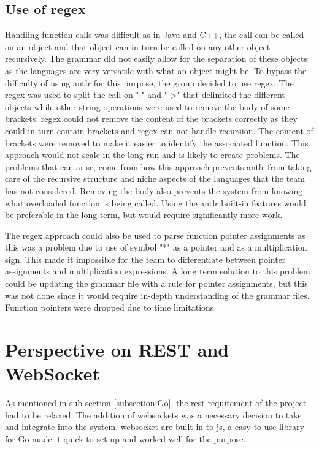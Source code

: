 \subsection{Use of regex}

Handling function calls was difficult as in Java and C++, the call can be called on an object and that object can in turn be called on any other object recursively. The grammar did not easily allow for the separation of these objects as the languages are very versatile with what an object might be. To bypass the difficulty of using \gls{antlr} for this purpose, the group decided to use \gls{regex}. The \gls{regex} was used to split the call on "." and "->" that delimited the different objects while other string operations were used to remove the body of some brackets. \Gls{regex} could not remove the content of the brackets correctly as they could in turn contain brackets and \gls{regex} can not handle \gls{recursion}. The content of brackets were removed to make it easier to identify the associated function. This approach would not scale in the long run and is likely to create problems. The problems that can arise, come from how this approach prevents \gls{antlr} from taking care of the recursive structure and niche aspects of the languages that the team has not considered. Removing the body also prevents the system from knowing what overloaded function is being called. Using the \gls{antlr} built-in features would be preferable in the long term, but would require significantly more work. 

The \Gls{regex} approach could also be used to parse function pointer assignments as this was a problem due to use of symbol "*" as a pointer and as a multiplication sign. This made it impossible for the team to differentiate between pointer assignments and multiplication expressions. A long term solution to this problem could be updating the grammar file with a rule for pointer assignments, but this was not done since it would require in-depth understanding of the grammar files. Function pointers were dropped due to time limitations.

\section{Perspective on REST and WebSocket}
As mentioned in sub section \ref{subsection:Go}, the \gls{rest} requirement of the project had to be relaxed. The addition of \glspl{websocket} was a necessary decision to take and integrate into the system. \Gls{websocket} are built-in to \gls{js}, a easy-to-use library for Go made it quick to set up and worked well for the purpose.

